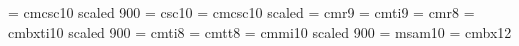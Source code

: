




\font\smallcaps = cmcsc10 scaled 900
\font\caps = \fontid csc10
\font\boldcaps = cmcsc10 scaled 
\font\rmlyrics = cmr9
\font\itlyrics = cmti9
\font\smallrm = cmr8
\font\itbfsm = cmbxti10 scaled 900
\font\smallit = cmti8
\font\smalltt = cmtt8
\font\smold = cmmi10 scaled 900
\font\amssymbols = msam10
\font\numerical = cmbx12




\newcount\hymnno
{}

\def\ngl#1{\cchar{-6}{\itlyrics #1}}
\def\engl#1{\cchar{-7}{\itlyrics #1}}
\def\sengl#1{\cchar{-9}{\itlyrics #1}}
\def\subengl#1{\cchar{-13}{\itlyrics #1}}

\def\tocsectionentry#1#2{\smallskip\goodbreak\line{{\bf #1}\dotfill {\oldstyle #2}\quad}}

\def\tocsubsectionentry#1#2{\line{\qquad \smallrm #1 \hfil}}

\def\beginpart #1\par{}



\def\beginhymn #1.{\line{ \hfil \bigtype \idx{#1} \hfil }\advance\hymnno by 1\par\bigskip}

\def\endhymn{\vfill\eject}

\def\mycr{\par\vskip-\parskip}

\def\beginlyrics{\begingroup
                       \def\\{\mycr}
                       \pretolerance=10000
                       \raggedright
                       \parskip=5pt
                       \parindent-3mm}
\def\endlyrics{\endgroup}

